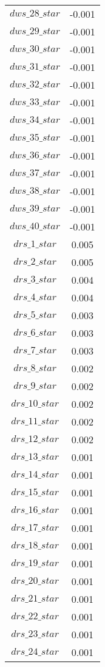 \begin{center}
\begin{longtable}{cc}
$dws\_28\_star$ 	 & 	 -0.001 \\
$dws\_29\_star$ 	 & 	 -0.001 \\
$dws\_30\_star$ 	 & 	 -0.001 \\
$dws\_31\_star$ 	 & 	 -0.001 \\
$dws\_32\_star$ 	 & 	 -0.001 \\
$dws\_33\_star$ 	 & 	 -0.001 \\
$dws\_34\_star$ 	 & 	 -0.001 \\
$dws\_35\_star$ 	 & 	 -0.001 \\
$dws\_36\_star$ 	 & 	 -0.001 \\
$dws\_37\_star$ 	 & 	 -0.001 \\
$dws\_38\_star$ 	 & 	 -0.001 \\
$dws\_39\_star$ 	 & 	 -0.001 \\
$dws\_40\_star$ 	 & 	 -0.001 \\
$drs\_1\_star$ 	 & 	 0.005 \\
$drs\_2\_star$ 	 & 	 0.005 \\
$drs\_3\_star$ 	 & 	 0.004 \\
$drs\_4\_star$ 	 & 	 0.004 \\
$drs\_5\_star$ 	 & 	 0.003 \\
$drs\_6\_star$ 	 & 	 0.003 \\
$drs\_7\_star$ 	 & 	 0.003 \\
$drs\_8\_star$ 	 & 	 0.002 \\
$drs\_9\_star$ 	 & 	 0.002 \\
$drs\_10\_star$ 	 & 	 0.002 \\
$drs\_11\_star$ 	 & 	 0.002 \\
$drs\_12\_star$ 	 & 	 0.002 \\
$drs\_13\_star$ 	 & 	 0.001 \\
$drs\_14\_star$ 	 & 	 0.001 \\
$drs\_15\_star$ 	 & 	 0.001 \\
$drs\_16\_star$ 	 & 	 0.001 \\
$drs\_17\_star$ 	 & 	 0.001 \\
$drs\_18\_star$ 	 & 	 0.001 \\
$drs\_19\_star$ 	 & 	 0.001 \\
$drs\_20\_star$ 	 & 	 0.001 \\
$drs\_21\_star$ 	 & 	 0.001 \\
$drs\_22\_star$ 	 & 	 0.001 \\
$drs\_23\_star$ 	 & 	 0.001 \\
$drs\_24\_star$ 	 & 	 0.001 \\

\end{longtable}
\end{center}
